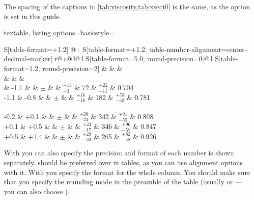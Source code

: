 The spacing of the captions in \cref{tab:viscosity,tab:xsect0} is the same,
as the option  is set in this guide.

\begin{table}[htbp]
  \caption{A selection of cross-section measurements!
    Typeset using the  macro.}%
  \label{tab:xsect0}
\begin{tcblisting}{textable,
  listing options={basicstyle=\ttfamily\footnotesize}}
\centering
\renewcommand{\arraystretch}{1.2}
\begin{tabular}{
    S[table-format=+1.2] @{\,:\,}
    S[table-format=+1.2, table-number-alignment=center-decimal-marker]
    r@{\,}c@{\,}l@{\,}l
    S[table-format=5.0, round-precision=0]@{\,}l
    S[table-format=1.2, round-precision=2]}
  \toprule
   &  
  &  & \Cbhad \\
   &  &
   & \\
   & -1.1 &  &
  \(\pm\) &  &
  \(^{+13}_{-3}\) &  72 & \(^{+22}_{-13}\) & 0.704 \\
  -1.1 & -0.8 &  &
  \(\pm\) &  &
  \(^{+16}_{-16}\) & 182 & \(^{+50}_{-30}\) & 0.781 \\
  \\
  -0.2 & +0.1 &  &
  \(\pm\) &  &
  \(^{+28}_{-23}\) & 342 & \(^{+91}_{-55}\) & 0.808 \\
  +0.1 & +0.5 &  &
  \(\pm\) &  &
  \(^{+23}_{-17}\) & 346 & \(^{+96}_{-57}\) & 0.847 \\
  +0.5 & +1.4 &  &
  \(\pm\) &  &
  \(^{+20}_{-30}\) & 265 & \(^{+82}_{-48}\) & 0.926 \\
  \bottomrule
\end{tabular}
\end{tcblisting}
\end{table}

With  you can also specify the precision and format of each
number is shown separately.
 should be preferred over  in tables,
as you can use alignment options with it.
With  you specify the format for the whole column.
You should make sure
that you specify the rounding mode in the preamble of the table (usually
 or  --- you can also choose ).

